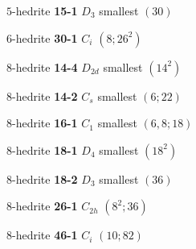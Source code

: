 \documentclass[12pt]{article}
\begin{document}
\begin{figure}
{\small
\begin{minipage}[t]{4cm}
\centering
\epsfxsize=4cm
\par
{$5$-hedrite {\bf 15-1} $D_3$ smallest $(30)$}
\end{minipage}
\begin{minipage}[t]{4cm}
\centering
\epsfxsize=4cm
\par
{$6$-hedrite {\bf 30-1} $C_i$ $(8;26^2)$}
\end{minipage}
\begin{minipage}[t]{4cm}
\centering
\epsfxsize=4cm
\par
{$8$-hedrite {\bf 14-4} $D_{2d}$ smallest $(14^2)$}
\end{minipage}
\begin{minipage}[t]{4cm}
\centering
\epsfxsize=4cm
\par
{$8$-hedrite {\bf 14-2} $C_s$ smallest $(6;22)$}
\end{minipage}
\begin{minipage}[t]{4cm}
\centering
\epsfxsize=4cm
\par
{$8$-hedrite {\bf 16-1} $C_1$ smallest $(6, 8; 18)$}
\end{minipage}
\begin{minipage}[t]{4cm}
\centering
\epsfxsize=4cm
\par
{$8$-hedrite {\bf 18-1} $D_4$ smallest $(18^2)$}
\end{minipage}
\begin{minipage}[t]{4cm}
\centering
\epsfxsize=4cm
\par
{$8$-hedrite {\bf 18-2} $D_3$ smallest $(36)$}
\end{minipage}
\begin{minipage}[t]{4cm}
\centering
\epsfxsize=4cm
\par
{$8$-hedrite {\bf 26-1} $C_{2h}$ $(8^2; 36)$}
\end{minipage}
\setlength{\unitlength}{1cm}
\begin{minipage}[t]{4cm}
\centering
\epsfxsize=4cm
\par
{$8$-hedrite {\bf 46-1} $C_i$ $(10; 82)$}
\end{minipage}
}
\end{figure}
\end{document}
